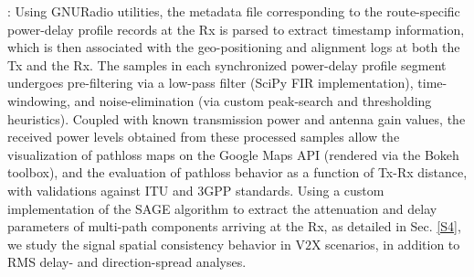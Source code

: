 \documentclass[10pt, twocolumn]{IEEEtran}
\begin{document}
: Using GNURadio utilities, the metadata file corresponding to the route-specific power-delay profile records at the Rx is parsed to extract timestamp information, which is then associated with the geo-positioning and alignment logs at both the Tx and the Rx. The samples in each synchronized power-delay profile segment undergoes pre-filtering via a low-pass filter (SciPy FIR implementation), time-windowing, and noise-elimination (via custom peak-search and thresholding heuristics). Coupled with known transmission power and antenna gain values, the received power levels obtained from these processed samples allow the visualization of pathloss maps on the Google Maps API (rendered via the Bokeh toolbox), and the evaluation of pathloss behavior as a function of Tx-Rx distance, with validations against ITU and $3$GPP standards. Using a custom implementation of the SAGE algorithm to extract the attenuation and delay parameters of multi-path components arriving at the Rx, as detailed in Sec. \ref{S4}, we study the signal spatial consistency behavior in V$2$X scenarios, in addition to RMS delay- and direction-spread analyses.
\end{document}
